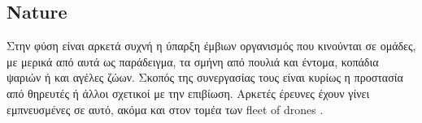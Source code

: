 \subsection{Nature} \label{sec:Chapter1-2-1}
Στην φύση είναι αρκετά συχνή η ύπαρξη έμβιων οργανισμός που κινούνται σε ομάδες, με μερικά από αυτά ως παράδειγμα, τα σμήνη από πουλιά και
έντομα, κοπάδια ψαριών ή και αγέλες ζώων. Σκοπός της συνεργασίας τους είναι κυρίως η προστασία από θηρευτές ή άλλοι σχετικοί με την επιβίωση.
Αρκετές έρευνες έχουν γίνει εμπνευ\-σμένες σε αυτό, ακόμα και στον τομέα των fleet of drones
\cite{research-on-drone-swarms-move-like-animals} \cite{research-on-drone-swarms-move-like-animals-like-documentary} \cite{swarm-of-drones}.
  
